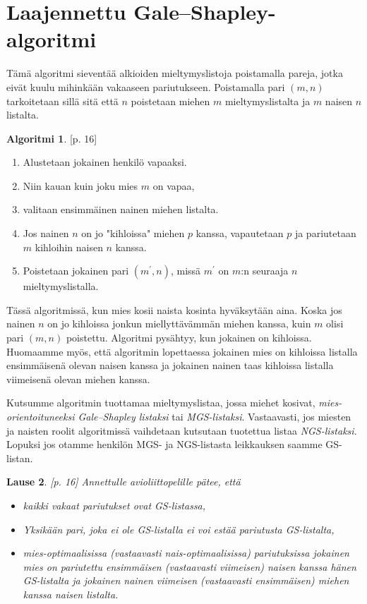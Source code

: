 \documentclass[finnish]{tktltiki2}
\newtheorem{lau}{Lause}
\theoremstyle{definition}
\newtheorem{alg}[lau]{Algoritmi}
\theoremstyle{remark}
\begin{document}
\section{Laajennettu Gale--Shapley-algoritmi}
Tämä algoritmi sieventää alkioiden mieltymyslistoja poistamalla pareja, jotka eivät kuulu mihinkään vakaaseen pariutukseen. Poistamalla pari $(m, n)$ tarkoitetaan sillä sitä että $n$ poistetaan miehen $m$ mieltymyslistalta ja $m$ naisen $n$ listalta.

\begin{alg}\cite{gusfield1989stable}[p. 16]\label{alg2}
	\begin{enumerate}
		\item Alustetaan jokainen henkilö vapaaksi.
		\item Niin kauan kuin joku mies $m$ on vapaa,
		\item valitaan ensimmäinen nainen miehen listalta.
		\item Jos nainen $n$ on jo "kihloissa" miehen $p$ kanssa, vapautetaan $p$ ja pariutetaan $m$ kihloihin naisen $n$ kanssa.
		\item Poistetaan jokainen pari $(m^{'}, n)$, missä $m^{'}$ on $m$:n seuraaja $n$ mieltymyslistalla.
	\end{enumerate}
\end{alg}

Tässä algoritmissä, kun mies kosii naista kosinta hyväksytään aina. Koska jos nainen $n$ on jo kihloissa jonkun miellyttävämmän miehen kanssa, kuin $m$ olisi pari $(m, n)$ poistettu.
Algoritmi pysähtyy, kun jokainen on kihloissa. Huomaamme myös, että algoritmin lopettaessa jokainen mies on kihloissa listalla ensimmäisenä olevan naisen kanssa ja jokainen nainen taas kihloissa listalla viimeisenä olevan miehen kanssa.

Kutsumme algoritmin tuottamaa mieltymyslistaa, jossa miehet kosivat, \emph{mies-orientoituneeksi Gale--Shapley listaksi} tai \emph{MGS-listaksi}. Vastaavasti, jos miesten ja naisten roolit algoritmissä vaihdetaan kutsutaan tuotettua listaa \emph{NGS-listaksi}. Lopuksi jos otamme henkilön MGS- ja NGS-listasta leikkauksen saamme GS-listan.

\begin{lau}\cite{gusfield1989stable}[p. 16]
	Annettulle avioliittopelille pätee, että
	\begin{itemize}
		\item kaikki vakaat pariutukset ovat GS-listassa,
		\item Yksikään pari, joka ei ole GS-listalla ei voi estää pariutusta GS-listalta,
		\item mies-optimaalisissa (vastaavasti nais-optimaalisissa) pariutuksissa jokainen mies on pariutettu ensimmäisen (vastaavasti viimeisen) naisen kanssa hänen GS-listalta ja jokainen nainen viimeisen (vastaavasti ensimmäisen) miehen kanssa naisen listalta.
	\end{itemize}
\end{lau}
\end{document}
